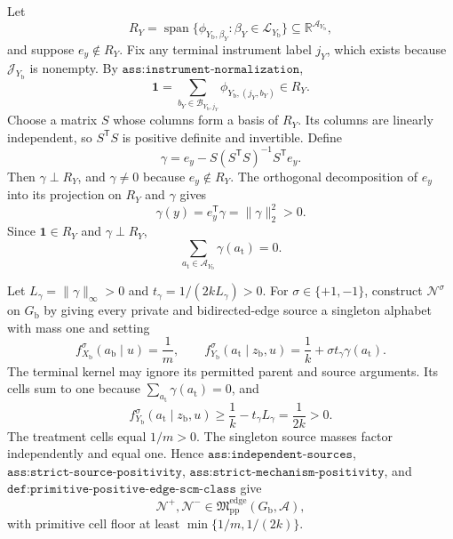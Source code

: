 Let
\[
R_Y=\operatorname{span}\{\phi_{Y_{\mathrm b},\beta_Y}:\beta_Y\in\mathcal L_{Y_{\mathrm b}}\}
\subseteq\mathbb R^{\mathcal A_{Y_{\mathrm b}}},
\]
and suppose \(e_y\notin R_Y\).  Fix any terminal instrument label \(j_Y\), which exists because \(\mathcal J_{Y_{\mathrm b}}\) is nonempty.  By \(\texttt{ass:instrument-normalization}\),
\[
\mathbf 1=\sum_{b_Y\in\mathcal B_{Y_{\mathrm b},j_Y}}
\phi_{Y_{\mathrm b},(j_Y,b_Y)}\in R_Y.
\]
Choose a matrix \(S\) whose columns form a basis of \(R_Y\).  Its columns are linearly independent, so \(S^{\mathsf T}S\) is positive definite and invertible.  Define
\[
\gamma=e_y-S(S^{\mathsf T}S)^{-1}S^{\mathsf T}e_y.
\]
Then \(\gamma\perp R_Y\), and \(\gamma\neq0\) because \(e_y\notin R_Y\).  The orthogonal decomposition of \(e_y\) into its projection on \(R_Y\) and \(\gamma\) gives
\[
\gamma(y)=e_y^{\mathsf T}\gamma=\lVert\gamma\rVert_2^2>0.
\]
Since \(\mathbf 1\in R_Y\) and \(\gamma\perp R_Y\),
\[
\sum_{a_{\mathrm t}\in\mathcal A_{Y_{\mathrm b}}}\gamma(a_{\mathrm t})=0.
\]

Let \(L_\gamma=\lVert\gamma\rVert_\infty>0\) and \(t_\gamma=1/(2kL_\gamma)>0\).  For \(\sigma\in\{+1,-1\}\), construct \(\mathcal N^\sigma\) on \(G_{\mathrm b}\) by giving every private and bidirected-edge source a singleton alphabet with mass one and setting
\[
f_{X_{\mathrm b}}^\sigma(a_{\mathrm b}\mid u)=\frac1m,
\qquad
f_{Y_{\mathrm b}}^\sigma(a_{\mathrm t}\mid z_{\mathrm b},u)
=\frac1k+\sigma t_\gamma\gamma(a_{\mathrm t}).
\]
The terminal kernel may ignore its permitted parent and source arguments.  Its cells sum to one because \(\sum_{a_{\mathrm t}}\gamma(a_{\mathrm t})=0\), and
\[
f_{Y_{\mathrm b}}^\sigma(a_{\mathrm t}\mid z_{\mathrm b},u)
\geq\frac1k-t_\gamma L_\gamma=\frac1{2k}>0.
\]
The treatment cells equal \(1/m>0\).  The singleton source masses factor independently and equal one.  Hence \(\texttt{ass:independent-sources}\), \(\texttt{ass:strict-source-positivity}\), \(\texttt{ass:strict-mechanism-positivity}\), and \(\texttt{def:primitive-positive-edge-scm-class}\) give
\[
\mathcal N^+,\mathcal N^-\in
\mathfrak M_{\mathrm{pp}}^{\mathrm{edge}}(G_{\mathrm b},\mathcal A),
\]
with primitive cell floor at least \(\min\{1/m,1/(2k)\}\).

